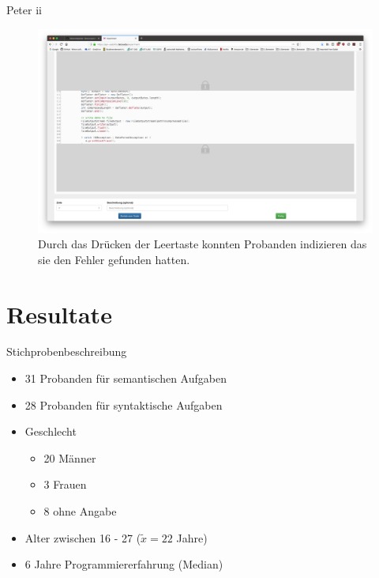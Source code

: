 \documentclass[10pt]{beamer}
\begin{document}
	\begin{frame}{Peter  ii}	
		\begin{figure}
			\includegraphics[scale=0.15]{graphics/peter_correction.png}
			\caption{\label{fig:peter_correction.png} Durch das Drücken der Leertaste konnten Probanden indizieren das sie den Fehler gefunden hatten.}
		\end{figure}
	\end{frame}

\section{Resultate}

	\begin{frame}{Stichprobenbeschreibung}
    
    \begin{itemize}
        \item 31 Probanden für semantischen Aufgaben
        \item 28 Probanden für syntaktische Aufgaben
        \item Geschlecht
        \begin{itemize}
            \item 20 Männer
            \item 3 Frauen
            \item 8 ohne Angabe
        \end{itemize}
        \item Alter zwischen 16 - 27 ($\tilde{x} = 22$ Jahre)
        \item 6 Jahre Programmiererfahrung (Median)
        
    \end{itemize}
	 
	\end{frame}
\end{document}
